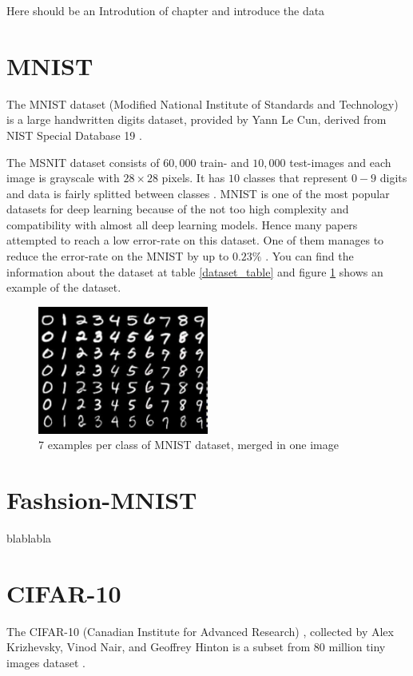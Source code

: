 Here should be an Introdution of chapter and introduce the data

\section{MNIST}
The MNIST dataset (Modified National Institute of Standards and Technology) is a large handwritten
digits dataset, provided by Yann Le Cun, derived from NIST Special Database 19 \cite{NIST}.

The MSNIT dataset consists of $60,000$ train- and $10,000$ test-images and each image is grayscale
with $28 \times 28$ pixels. It has $10$ classes that represent $0-9$ digits and data is fairly
splitted between classes \cite{MNIST_data_reference}. MNIST is one of the most popular datasets for
deep learning because of the not too high complexity and compatibility with almost all deep learning
models. Hence many papers attempted to reach a low error-rate on this dataset. One of them manages
to reduce the error-rate on the MNIST by up to $0.23\%$ \cite{MNIST_best_result_reference}. You can
find the information about the dataset at table
\ref{dataset_table} and figure \ref{fig:mnist_dataset_example} shows an example of the dataset.

\begin{figure}
  \centering
  \label{fig:mnist_dataset_example}
  \includegraphics[width=0.5\textwidth]{fig/mnist}
  \caption{7 examples per class of MNIST dataset, merged in one image \cite{MNIST_dataset_example}}
\end{figure}


\section{Fashsion-MNIST}
blablabla


\section{CIFAR-10}
The CIFAR-10 (Canadian Institute for Advanced Research)
, collected by Alex Krizhevsky, Vinod Nair, and Geoffrey Hinton is a subset from 80 million tiny
images dataset \cite{CIFAR-10_origin_dataset}.

